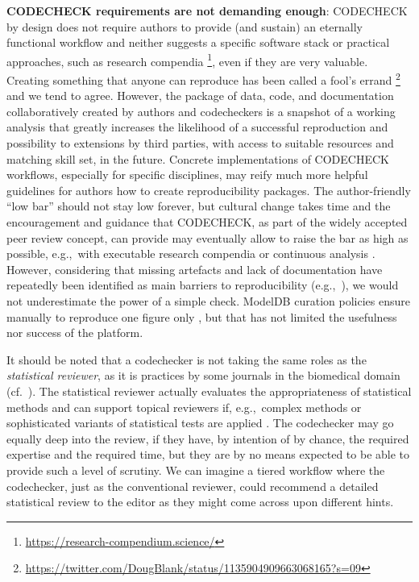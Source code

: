 \documentclass[12pt]{article}
\begin{document}
\textbf{CODECHECK requirements are not demanding enough}:
CODECHECK by design does not require authors to provide (and sustain) an
eternally functional workflow and neither suggests a specific software stack
or practical approaches, such as research compendia
\footnote{\url{https://research-compendium.science/}},
even if they are very valuable.
Creating something that anyone can reproduce has been called a 
fool's errand
\footnote{\url{https://twitter.com/DougBlank/status/1135904909663068165?s=09}}
and we tend to agree.
However, the package of data, code, and documentation
collaboratively created by authors and codecheckers is a snapshot of a 
working analysis that greatly increases the likelihood of a successful 
reproduction and possibility to extensions by third parties, with access
to suitable resources and matching skill set, in the future.
Concrete implementations of CODECHECK workflows, especially for specific
disciplines, may reify much more helpful guidelines for authors how to
create reproducibility packages.
The author-friendly ``low bar'' should not stay low forever, but cultural
change takes time and the encouragement and guidance that CODECHECK,
as part of the widely accepted peer review concept, can provide may
eventually allow to raise the bar as high as possible, e.g.,~with
executable research compendia \cite{nust_opening_2017}
or continuous analysis \cite{beaulieu-jones_reproducibility_2017-1}.
However, considering that missing artefacts and lack of documentation
have repeatedly been identified as main barriers to reproducibility
(e.g.,~\cite{stagge_assessing_2019,nust_improving_2020}),
we would not underestimate the power of a simple check.
ModelDB curation policies ensure manually to reproduce one figure only 
\cite{mcdougal_reproducibility_2016}, but that has not limited the usefulness
nor success of the platform.

It should be noted that a codechecker is not taking the same roles as the
\emph{statistical reviewer}, as it is practices by some journals in the 
biomedical domain (cf.~\cite{petrovecki_role_2009,greenwood_how_2015}).
The statistical reviewer actually evaluates the appropriateness of
statistical methods \cite{greenwood_how_2015} and can support topical
reviewers if, e.g.,~complex methods or sophisticated variants of statistical
tests are applied \cite{petrovecki_role_2009}.
The codechecker may go equally deep into the review, if they have, by 
intention of by chance, the required expertise and the required time, 
but they are by no means expected to be able to provide
such a level of scrutiny. We can imagine a tiered workflow where the 
codechecker, just as the conventional reviewer, could recommend a detailed
statistical review to the editor as they might come across upon different
hints.
\end{document}
